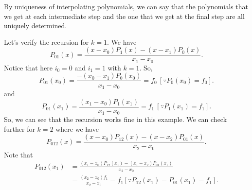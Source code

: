 By uniqueness of interpolating polynomials, we can say that the polynomials that we get at each intermediate step and the one that we get at the final step are all uniquely determined.
\begin{example}
   Let's verify the recursion for $k=1$. We have 
   \[
      P_{01}(x) = \frac{(x-x_0)P_1(x) - (x-x_1)P_0(x)}{x_1-x_0}
   .\]
   Notice that here $ i_0 = 0$ and $ i_1=1$ with $k=1$. So,
   \[
      P_{01}(x_0) = \frac{-(x_0-x_1)P_0(x_0)}{x_1-x_0} = f_0 \ [\because P_0(x_0) = f_0]
   .\] 
   and 
   \[
      P_{01}(x_1) = \frac{(x_1-x_0)P_1(x_1)}{x_1-x_0} = f_1 \ [\because P_1(x_1) = f_1]
   .\]
   So, we can see that the recursion works fine in this example.
   We can check further for $k=2$ where we have 
    \[
       P_{012}(x) = \frac{(x-x_0)P_{12}(x) - (x-x_2)P_{01}(x)}{x_2-x_0}
   .\] 
   Note that
   \begin{align*}
      P_{012}(x_1) &= \frac{(x_1-x_0)P_{12}(x_1)-(x_1-x_2)P_{01}(x_1)}{x_2-x_0} \\
                   &= \frac{(x_2-x_0)f_1}{x_2-x_0} = f_1 [\because P_{12}(x_1)=P_{01}(x_1)=f_1]
   .\end{align*}
\end{example}

